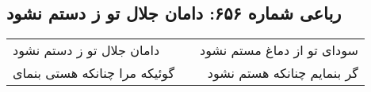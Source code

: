 \begin{center}
\section*{رباعی شماره ۶۵۶: دامان جلال تو ز دستم نشود}
\label{sec:0656}
\begin{longtable}{l p{0.5cm} r}
دامان جلال تو ز دستم نشود
&&
سودای تو از دماغ مستم نشود
\\
گوئیکه مرا چنانکه هستی بنمای
&&
گر بنمایم چنانکه هستم نشود
\\
\end{longtable}
\end{center}
